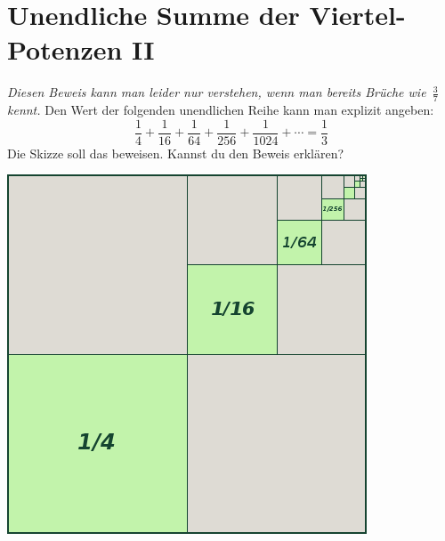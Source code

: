 \documentclass{../../zirkelblatt}
\begin{document}
\section*{Unendliche Summe der Viertel-Potenzen II}
\emph{Diesen Beweis kann man leider nur verstehen, wenn man bereits Brüche
wie~$\frac{3}{7}$ kennt.}
Den Wert der folgenden unendlichen Reihe kann man
explizit angeben:
\[ \frac{1}{4} + \frac{1}{16} + \frac{1}{64} +
\frac{1}{256} + \frac{1}{1024} + \cdots = \frac{1}{3} \]
Die Skizze soll das beweisen. Kannst du den Beweis erklären?
\begin{center}
\includegraphics[scale=0.5]{geometrische-reihe-2}
\end{center}


\newpage
\end{document}
